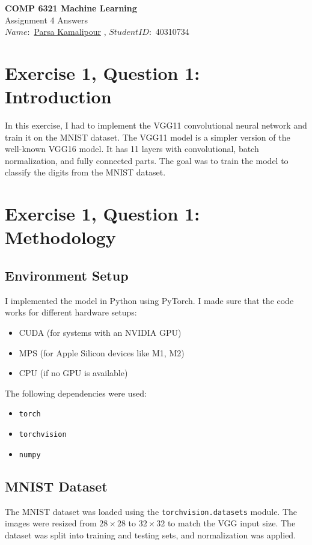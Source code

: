 \documentclass[10pt,letter,notitlepage]{article}
\newcounter{exercise}
\begin{document}
\begin{center}
  \large{\textbf{COMP 6321 Machine Learning} \\ Assignment 4 Answers} \\


$Name:$ \href{https://benymaxparsa.github.io}{Parsa Kamalipour} \; , \; $Student ID:$ 40310734


\section{Exercise 1, Question 1: Introduction}
In this exercise, I had to implement the VGG11 convolutional neural network and train it on the MNIST dataset. The VGG11 model is a simpler version of the well-known VGG16 model. It has 11 layers with convolutional, batch normalization, and fully connected parts. The goal was to train the model to classify the digits from the MNIST dataset.

\section{Exercise 1, Question 1: Methodology}

\subsection{Environment Setup}
I implemented the model in Python using PyTorch. I made sure that the code works for different hardware setups:
\begin{itemize}
    \item CUDA (for systems with an NVIDIA GPU)
    \item MPS (for Apple Silicon devices like M1, M2)
    \item CPU (if no GPU is available)
\end{itemize}

The following dependencies were used:
\begin{itemize}
    \item \texttt{torch}
    \item \texttt{torchvision}
    \item \texttt{numpy}
\end{itemize}

\subsection{MNIST Dataset}
The MNIST dataset was loaded using the \texttt{torchvision.datasets} module. The images were resized from $28 \times 28$ to $32 \times 32$ to match the VGG input size. The dataset was split into training and testing sets, and normalization was applied.


\end{center}
\end{document}
